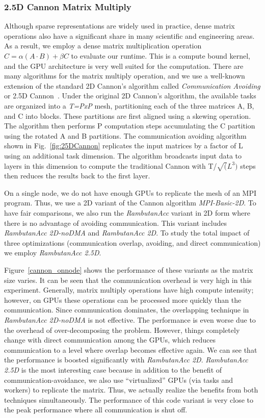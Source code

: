 \subsubsection{2.5D Cannon Matrix Multiply}
Although sparse representations are widely used in practice, dense matrix operations also have a significant share in many scientific and engineering areas.
As a result, we employ a dense matrix multiplication operation $C = \alpha (A \cdot B) + \beta C$ to evaluate our runtime.
This is a compute bound kernel, and the GPU architecture is very well suited for the computation. 
There are many algorithms for the matrix multiply operation, and we use a well-known extension of the standard 2D Cannon's algorithm called {\em Communication Avoiding} or 2.5D Cannon~\cite{25Dcannon}. 
Under the original 2D Cannon's algorithm, the available tasks are organized into a {\em T=PxP} mesh, partitioning each of the three matrices A, B, and C into blocks.
These partitions are first aligned using a skewing operation.
The algorithm then performs P computation steps accumulating the C partition using the rotated A and B partitions.
The communication avoiding algorithm shown in Fig.~\ref{fig:25DCannon} replicates the input matrices by a factor of L using an additional task dimension.
The algorithm broadcasts input data to layers in this dimension to compute the traditional Cannon with T/$\sqrt(L^3)$ steps then reduces the results back to the first layer.

On a single node, we do not have enough GPUs to replicate the mesh of an MPI program.
Thus, we use a 2D variant of the Cannon algorithm {\em MPI-Basic-2D}.
To have fair comparisons, we also run the {\em RambutanAcc} variant in 2D form where there is no advantage of avoiding communication.
This variant includes {\em RambutanAcc 2D-noDMA} and {\em RambutanAcc 2D}.
To study the total impact of three optimizations (communication overlap, avoiding, and direct communication) we employ {\em RambutanAcc 2.5D}.

Figure~\ref{cannon_onnode} shows the performance of these variants as the matrix size varies.
It can be seen that the communication overhead is very high in this experiment.
Generally, matrix multiply operations have high compute intensity;
however, on GPUs these operations can be processed more quickly than the communication.
Since communication dominates, the overlapping technique in {\em RambutanAcc 2D-noDMA} is not effective.
The performance is even worse due to the overhead of over-decomposing the problem.
However, things completely change with direct communication among the GPUs, which
reduces communication to a level where overlap becomes effective again.
We can see that the performance is boosted significantly with {\em RambutanAcc 2D}.
{\em RambutanAcc 2.5D} is the most interesting case because in addition to the benefit of communication-avoidance,
we also use ``virtualized'' GPUs (via tasks and workers) to replicate the matrix.
Thus, we actually realize the benefits from both techniques simultaneously.
The performance of this code variant is very close to the peak performance where all communication is shut off.



